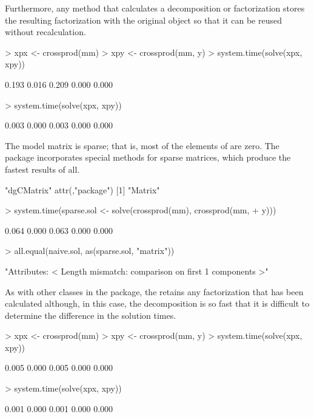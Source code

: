 \documentclass{article}
\begin{document}
Furthermore, any method that calculates a
decomposition or factorization stores the resulting factorization with
the original object so that it can be reused without recalculation.
\begin{Schunk}
\begin{Sinput}
> xpx <- crossprod(mm)
> xpy <- crossprod(mm, y)
> system.time(solve(xpx, xpy))
\end{Sinput}
\begin{Soutput}
[1] 0.193 0.016 0.209 0.000 0.000
\end{Soutput}
\begin{Sinput}
> system.time(solve(xpx, xpy))
\end{Sinput}
\begin{Soutput}
[1] 0.003 0.000 0.003 0.000 0.000
\end{Soutput}
\end{Schunk}

The model matrix  is sparse; that is, most of the elements of
 are zero.  The  package incorporates special
methods for sparse matrices, which produce the fastest results of all.

\begin{Schunk}
\begin{Soutput}
[1] "dgCMatrix"
attr(,"package")
[1] "Matrix"
\end{Soutput}
\begin{Sinput}
> system.time(sparse.sol <- solve(crossprod(mm), crossprod(mm, 
+     y)))
\end{Sinput}
\begin{Soutput}
[1] 0.064 0.000 0.063 0.000 0.000
\end{Soutput}
\begin{Sinput}
> all.equal(naive.sol, as(sparse.sol, "matrix"))
\end{Sinput}
\begin{Soutput}
[1] "Attributes: < Length mismatch: comparison on first 1 components >"
\end{Soutput}
\end{Schunk}

As with other classes in the  package, the
 retains any factorization that has been calculated
although, in this case, the decomposition is so fast that it is
difficult to determine the difference in the solution times.

\begin{Schunk}
\begin{Sinput}
> xpx <- crossprod(mm)
> xpy <- crossprod(mm, y)
> system.time(solve(xpx, xpy))
\end{Sinput}
\begin{Soutput}
[1] 0.005 0.000 0.005 0.000 0.000
\end{Soutput}
\begin{Sinput}
> system.time(solve(xpx, xpy))
\end{Sinput}
\begin{Soutput}
[1] 0.001 0.000 0.001 0.000 0.000
\end{Soutput}
\end{Schunk}


\end{document}
